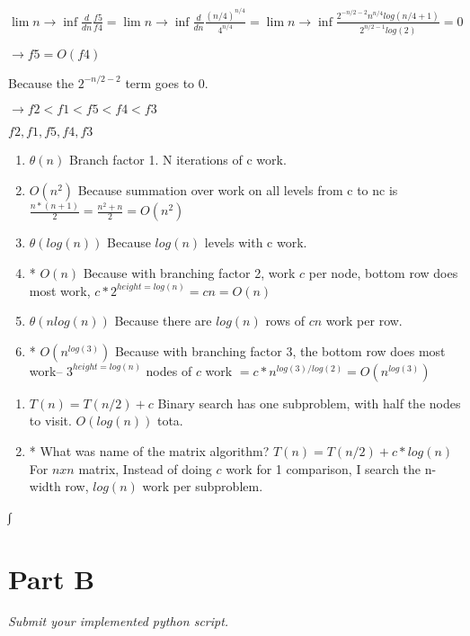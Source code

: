 \documentclass[12pt,twoside]{article}
\begin{document}
\begin{problems}
\begin{problemparts}
$ \lim n \rightarrow \inf \frac{d}{dn} \frac{f5}{f4} = \lim n \rightarrow \inf \frac{d}{dn} \frac{(n/4)^{n/4}}{4^{n/4}} = \lim n \rightarrow \inf \frac{2^{-n/2 -2}n^{n/4}log(n/4 +1)}{2^{n/2 -1}log(2)} = 0 $

$ \rightarrow f5 = O(f4) $

Because the $2^{-n/2 -2}$ term goes to $0$.

$ \rightarrow f2 < f1 < f5 < f4 < f3 $

$ f2, f1, f5, f4, f3 $

\end{problemparts}

\problem  %

\begin{problemparts}
\problempart
\begin{enumerate}
\item $\theta(n)$ Branch factor 1. N iterations of c work.
\item $O(n^2)$ Because summation over work on all levels from c to nc is $\frac{n*(n+1)}{2} = \frac{n^2 + n}{2} = O(n^2)$
\item $\theta(log(n))$ Because $log(n)$ levels with c work.
\item * $O(n)$ Because with branching factor 2, work $c$ per node, bottom row does most work, $c*2^{height = log(n)} = cn = O(n)$
\item $\theta(nlog(n))$ Because there are $log(n)$ rows of $cn$ work per row.
\item * $O(n^{log(3)})$ Because with branching factor 3, the bottom row does most work– $3^{height = log(n)}$ nodes of $c$ work $= c*n^{log(3)/log(2)} = O(n^{log(3)})$
\end{enumerate}
\problempart
\begin{enumerate}
\item $T(n) = T(n/2) + c$ Binary search has one subproblem, with half the nodes to visit. $O(log(n))$ tota.
\item * What was name of the matrix algorithm? $T(n) = T(n/2) + c*log(n)$ For $nxn$ matrix, Instead of doing $c$ work for 1 comparison, I search the n-width row, $log(n)$ work per subproblem.
\end{enumerate}∫
\end{problemparts}

\problem  %
\begin{problemparts}
\problempart
\problempart
\end{problemparts}

\section*{Part B}
\problem  %
\begin{problemparts}
\emph{Submit your implemented python script.}
\problempart
\problempart
\problempart
\problempart
\problempart
\end{problemparts}
\end{problems}
\end{document}
